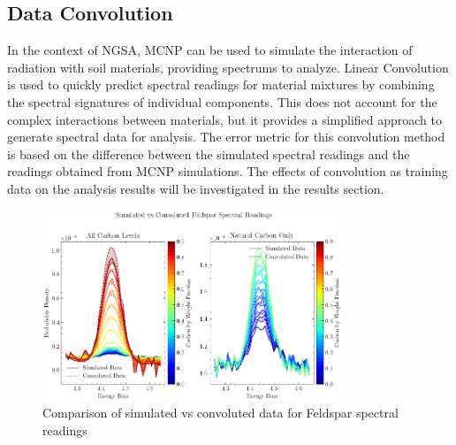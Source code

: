 \subsection{Data Convolution}

In the context of NGSA, MCNP can be used to simulate the interaction of radiation with soil materials, providing spectrums to analyze. Linear Convolution is used to quickly predict spectral readings for material mixtures by combining the spectral signatures of individual components. This does not account for the complex interactions between materials, but it provides a simplified approach to generate spectral data for analysis. The error metric for this convolution method is based on the difference between the simulated spectral readings and the readings obtained from MCNP simulations. The effects of convolution as training data on the analysis results will be investigated in the results section.

\begin{figure}[H]
\centering
\includegraphics[width=0.8\textwidth]{../Figures/DataGeneration/Sim_vs_Convoluted_FeldsparSpectralReadings_Combined.png}
\caption{Comparison of simulated vs convoluted data for Feldspar spectral readings}
\label{fig:sim_vs_conv}
\end{figure}
